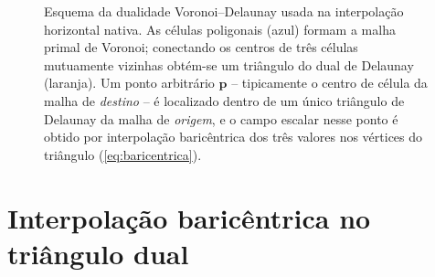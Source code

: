 \begin{figure}[H]
  \caption{Esquema da dualidade Voronoi--Delaunay usada na interpolação
    horizontal nativa. As células poligonais (azul) formam a malha
    primal de Voronoi; conectando os centros de três células mutuamente
    vizinhas obtém-se um triângulo do dual de Delaunay (laranja). Um
    ponto arbitrário $\mathbf{p}$ -- tipicamente o centro de célula da
    malha de \emph{destino} -- é localizado dentro de um único triângulo
    de Delaunay da malha de \emph{origem}, e o campo escalar nesse ponto
    é obtido por interpolação baricêntrica dos três valores nos vértices
    do triângulo (\cref{eq:baricentrica}).}
  \label{fig:voronoi_delaunay}
\end{figure}

\section{Interpolação baricêntrica no triângulo dual}
\label{sec:baricentrica}

